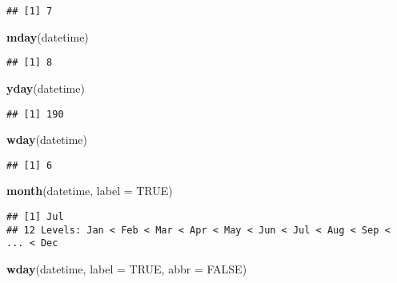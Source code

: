 \documentclass[
]{article}
\newenvironment{Shaded}{\begin{snugshade}}{\end{snugshade}}
\newcommand{\AttributeTok}[1]{\textcolor[rgb]{0.13,0.29,0.53}{#1}}
\newcommand{\ConstantTok}[1]{\textcolor[rgb]{0.56,0.35,0.01}{#1}}
\newcommand{\FunctionTok}[1]{\textcolor[rgb]{0.13,0.29,0.53}{\textbf{#1}}}
\newcommand{\NormalTok}[1]{#1}
\begin{document}
\begin{verbatim}
## [1] 7
\end{verbatim}

\begin{Shaded}
\begin{Highlighting}[]
\FunctionTok{mday}\NormalTok{(datetime)}
\end{Highlighting}
\end{Shaded}

\begin{verbatim}
## [1] 8
\end{verbatim}

\begin{Shaded}
\begin{Highlighting}[]
\FunctionTok{yday}\NormalTok{(datetime)}
\end{Highlighting}
\end{Shaded}

\begin{verbatim}
## [1] 190
\end{verbatim}

\begin{Shaded}
\begin{Highlighting}[]
\FunctionTok{wday}\NormalTok{(datetime)}
\end{Highlighting}
\end{Shaded}

\begin{verbatim}
## [1] 6
\end{verbatim}

\begin{Shaded}
\begin{Highlighting}[]
\FunctionTok{month}\NormalTok{(datetime, }\AttributeTok{label =} \ConstantTok{TRUE}\NormalTok{)}
\end{Highlighting}
\end{Shaded}

\begin{verbatim}
## [1] Jul
## 12 Levels: Jan < Feb < Mar < Apr < May < Jun < Jul < Aug < Sep < ... < Dec
\end{verbatim}

\begin{Shaded}
\begin{Highlighting}[]
\FunctionTok{wday}\NormalTok{(datetime, }\AttributeTok{label =} \ConstantTok{TRUE}\NormalTok{, }\AttributeTok{abbr =} \ConstantTok{FALSE}\NormalTok{)}
\end{Highlighting}
\end{Shaded}
\end{document}
